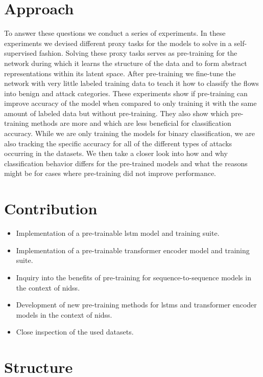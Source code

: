 \section{Approach} \label{sect.approach}

To answer these questions we conduct a series of experiments. In these experiments we devised different proxy tasks for the models to solve in a self-supervised fashion. Solving these proxy tasks serves as pre-training for the network during which it learns the structure of the data and to form abstract representations within its latent space. After pre-training we fine-tune the network with very little labeled training data to teach it how to classify the flows into benign and attack categories. These experiments show if pre-training can improve accuracy of the model when compared to only training it with the same amount of labeled data but without pre-training. They also show which pre-training methods are more and which are less beneficial for classification accuracy. 
While we are only training the models for binary classification, we are also tracking the specific accuracy for all of the different types of attacks occurring in the datasets. We then take a closer look into how and why classification behavior differs for the pre-trained models and what the reasons might be for cases where pre-training did not improve performance.

\section{Contribution} \label{sect.contribution}

\begin{itemize}
	\item Implementation of a pre-trainable \gls{lstm} model and training suite.
	\item Implementation of a pre-trainable transformer encoder model and training suite.
	\item Inquiry into the benefits of pre-training for sequence-to-sequence models in the context of \glspl{nids}.
	\item Development of new pre-training methods for \glspl{lstm} and transformer encoder models in the context of \glspl{nids}.
	\item Close inspection of the used datasets.
\end{itemize}

\section{Structure} \label{sect.structure}

